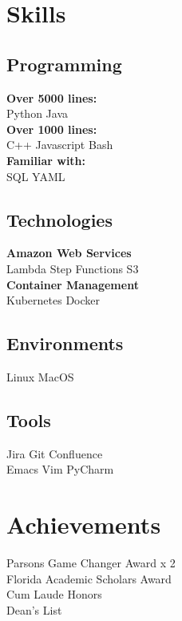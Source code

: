 \documentclass[letterpaper]{deedy-resume}
\begin{document}
\begin{minipage}[t]{0.33\textwidth}
\section{Skills}

\subsection{Programming}
\textbf{Over 5000 lines:} \\
Python \textbullet{} Java \\
\textbf{Over 1000 lines:} \\
C++ \textbullet{} Javascript \textbullet{} Bash \\
\textbf{Familiar with:} \\
SQL \textbullet{} YAML

\sectionspace
\subsection{Technologies}
\textbf{Amazon Web Services} \\
Lambda \textbullet{} Step Functions \textbullet{} S3\\
\textbf{Container Management} \\
Kubernetes \textbullet{} Docker


\sectionspace
\subsection{Environments}
Linux \textbullet{} MacOS

\sectionspace
\subsection{Tools}
Jira \textbullet{} Git \textbullet{} Confluence \\
Emacs \textbullet{} Vim \textbullet{} PyCharm
\sectionspace %
\section{Achievements}
Parsons Game Changer Award x 2 \\
Florida Academic Scholars Award \\
Cum Laude Honors \\
Dean's List
\end{minipage} %
\hfill
\end{document}
